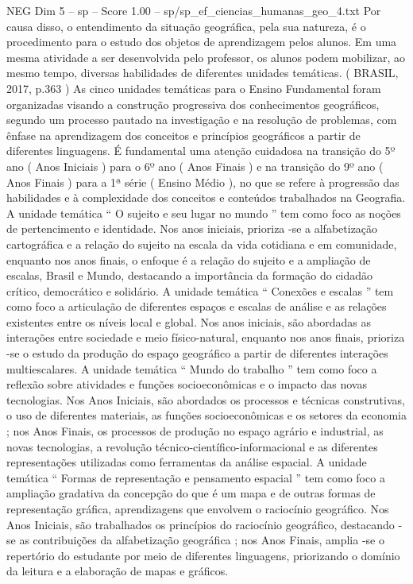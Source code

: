 \begin{textsample}{NEG Dim 5 – sp – Score 1.00 – sp/sp\_ef\_ciencias\_humanas\_geo\_4.txt}
Por causa disso, o entendimento da situação geográfica, pela sua natureza, é o procedimento para o estudo dos objetos de aprendizagem pelos alunos.
Em uma mesma atividade a ser desenvolvida pelo professor, os alunos podem mobilizar, ao mesmo tempo, diversas habilidades de diferentes unidades temáticas. ( BRASIL, 2017, p.363 ) As cinco unidades temáticas para o Ensino Fundamental foram organizadas visando a construção progressiva dos conhecimentos geográficos, segundo um processo pautado na investigação e na resolução de problemas, com ênfase na aprendizagem dos conceitos e princípios geográficos a partir de diferentes linguagens.
É fundamental uma atenção cuidadosa na transição do 5º ano ( Anos Iniciais ) para o 6º ano ( Anos Finais ) e na transição do 9º ano ( Anos Finais ) para a 1ª série ( Ensino Médio ), no que se refere à progressão das habilidades e à complexidade dos conceitos e conteúdos trabalhados na Geografia.
A unidade temática “ O sujeito e seu lugar no mundo ” tem como foco as noções de pertencimento e identidade.
Nos anos iniciais, prioriza -se a alfabetização cartográfica e a relação do sujeito na escala da vida cotidiana e em comunidade, enquanto nos anos finais, o enfoque é a relação do sujeito e a ampliação de escalas, Brasil e Mundo, destacando a importância da formação do cidadão crítico, democrático e solidário.
A unidade temática “ Conexões e escalas ” tem como foco a articulação de diferentes espaços e escalas de análise e as relações existentes entre os níveis local e global.
Nos anos iniciais, são abordadas as interações entre sociedade e meio físico-natural, enquanto nos anos finais, prioriza -se o estudo da produção do espaço geográfico a partir de diferentes interações multiescalares.
A unidade temática “ Mundo do trabalho ” tem como foco a reflexão sobre atividades e funções socioeconômicas e o impacto das novas tecnologias.
Nos Anos Iniciais, são abordados os processos e técnicas construtivas, o uso de diferentes materiais, as funções socioeconômicas e os setores da economia ; nos Anos Finais, os processos de produção no espaço agrário e industrial, as novas tecnologias, a revolução técnico-científico-informacional e as diferentes representações utilizadas como ferramentas da análise espacial.
A unidade temática “ Formas de representação e pensamento espacial ” tem como foco a ampliação gradativa da concepção do que é um mapa e de outras formas de representação gráfica, aprendizagens que envolvem o raciocínio geográfico.
Nos Anos Iniciais, são trabalhados os princípios do raciocínio geográfico, destacando -se as contribuições da alfabetização geográfica ; nos Anos Finais, amplia -se o repertório do estudante por meio de diferentes linguagens, priorizando o domínio da leitura e a elaboração de mapas e gráficos.

\end{textsample}
